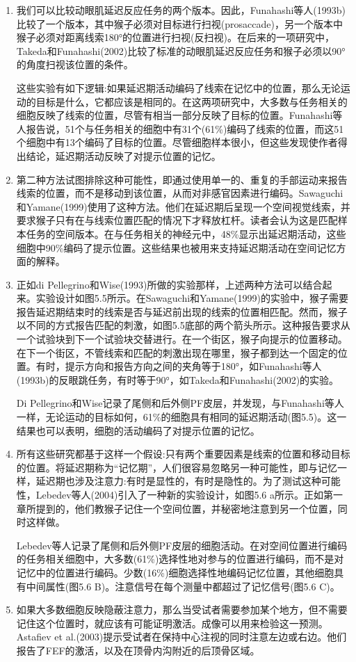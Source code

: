 \begin{enumerate}
	\item 我们可以比较动眼肌延迟反应任务的两个版本。因此，Funahashi等人(1993b)比较了一个版本，其中猴子必须对目标进行扫视(prosaccade)，另一个版本中猴子必须对距离线索180°的位置进行扫视(反扫视)。在后来的一项研究中，Takeda和Funahashi(2002)比较了标准的动眼肌延迟反应任务和猴子必须以90°的角度扫视该位置的条件。
	
	这些实验有如下逻辑:如果延迟期活动编码了线索在记忆中的位置，那么无论运动的目标是什么，它都应该是相同的。在这两项研究中，大多数与任务相关的细胞反映了线索的位置，尽管有相当一部分反映了目标的位置。Funahashi等人报告说，51个与任务相关的细胞中有31个(61\%)编码了线索的位置，而这51个细胞中有13个编码了目标的位置。尽管细胞样本很小，但这些发现使作者得出结论，延迟期活动反映了对提示位置的记忆。
	\item 第二种方法试图排除这种可能性，即通过使用单一的、重复的手部运动来报告线索的位置，而不是移动到该位置，从而对非感官因素进行编码。Sawaguchi和Yamane(1999)使用了这种方法。他们在延迟期后呈现一个空间视觉线索，并要求猴子只有在与线索位置匹配的情况下才释放杠杆。读者会认为这是匹配样本任务的空间版本。在与任务相关的神经元中，48\%显示出延迟期活动，这些细胞中90\%编码了提示位置。这些结果也被用来支持延迟期活动在空间记忆方面的解释。
	\item 正如di Pellegrino和Wise(1993)所做的实验那样，上述两种方法可以结合起来。实验设计如图5.5所示。在Sawaguchi和Yamane(1999)的实验中，猴子需要报告延迟期结束时的线索是否与延迟前出现的线索的位置相匹配。然而，猴子以不同的方式报告匹配的刺激，如图5.5底部的两个箭头所示。这种报告要求从一个试验块到下一个试验块交替进行。在一个街区，猴子向提示的位置移动。在下一个街区，不管线索和匹配的刺激出现在哪里，猴子都到达一个固定的位置。有时，提示方向和报告方向之间的夹角等于180°，如Funahashi等人(1993b)的反眼跳任务，有时等于90°，如Takeda和Funahashi(2002)的实验。
	
	Di Pellegrino和Wise记录了尾侧和后外侧PF皮层，并发现，与Funahashi等人一样，无论运动的目标如何，61\%的细胞具有相同的延迟期活动(图5.5)。这一结果也可以表明，细胞的活动编码了对提示位置的记忆。
	\item 所有这些研究都基于这样一个假设:只有两个重要因素是线索的位置和移动目标的位置。将延迟期称为“记忆期”，人们很容易忽略另一种可能性，即与记忆一样，延迟期也涉及注意力:有时是显性的，有时是隐性的。为了测试这种可能性，Lebedev等人(2004)引入了一种新的实验设计，如图5.6 a所示。正如第一章所提到的，他们教猴子记住一个空间位置，并秘密地注意到另一个位置，同时这样做。
	
	Lebedev等人记录了尾侧和后外侧PF皮层的细胞活动。在对空间位置进行编码的任务相关细胞中，大多数(61\%)选择性地对参与的位置进行编码，而不是对记忆中的位置进行编码。少数(16\%)细胞选择性地编码记忆位置，其他细胞具有中间属性(图5.6 B)。注意信号在每个测量中都超过了记忆信号(图5.6 C)。
	\item 如果大多数细胞反映隐蔽注意力，那么当受试者需要参加某个地方，但不需要记住这个位置时，就应该有可能证明激活。成像可以用来检验这一预测。Astafiev et al.(2003)提示受试者在保持中心注视的同时注意左边或右边。他们报告了FEF的激活，以及在顶骨内沟附近的后顶骨区域。
	

\end{enumerate}
